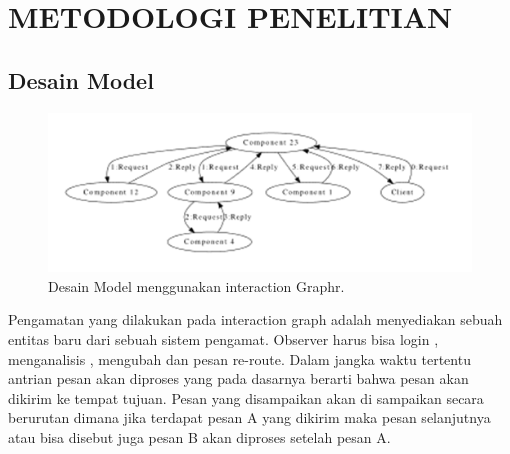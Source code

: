 \documentclass{jtetiproposalskripsi}
\begin{document}
\chapter{METODOLOGI PENELITIAN}

\section{Desain Model}
\begin{figure}[ht!]
  \centering
    \includegraphics{gambar/8}
    \caption{Desain Model menggunakan interaction Graphr.}
    \label{Desain Model menggunakan interaction Graph}
\end{figure}
Pengamatan yang dilakukan pada interaction graph adalah menyediakan sebuah entitas baru dari sebuah sistem pengamat. Observer harus bisa login , menganalisis , mengubah dan pesan re-route. Dalam jangka waktu tertentu antrian pesan akan diproses yang pada dasarnya berarti bahwa pesan akan dikirim ke tempat tujuan. Pesan yang disampaikan akan di sampaikan secara berurutan dimana jika terdapat pesan A yang dikirim maka pesan selanjutnya atau bisa disebut juga pesan B akan diproses setelah pesan A.
\end{document}
